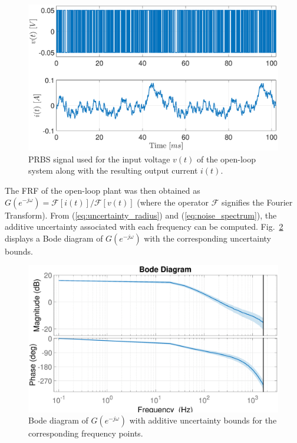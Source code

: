 \documentclass[journal]{IEEEtran}
\newcommand{\jo}{(e^{-j\omega})}
\begin{document}
\begin{figure}
\centering
\includegraphics[width=\columnwidth]{pics_prbs/prbs_time.eps}
\caption{PRBS signal used for the input voltage $v(t)$ of the open-loop system along with the resulting output current $i(t)$.}
\label{fig:PRBS}
\end{figure}
The FRF of the open-loop plant was then obtained as $G\jo=\mathcal{F}[i(t)]/ \mathcal{F}[v(t)]$ (where the operator $\mathcal{F}$ signifies the Fourier Transform). From (\ref{eq:uncertainty_radius}) and (\ref{eq:noise_spectrum}), the additive uncertainty associated with each frequency can be computed. Fig.~\ref{fig:plant_uncertain} displays a Bode diagram of $G\jo$ with the corresponding uncertainty bounds. 

\begin{figure}
\centering
\includegraphics[width=\columnwidth]{pics_prbs/bode.eps}
\caption{Bode diagram of $G\jo$ with additive uncertainty bounds for the corresponding frequency points.}
\label{fig:plant_uncertain}
\end{figure}
\end{document}
